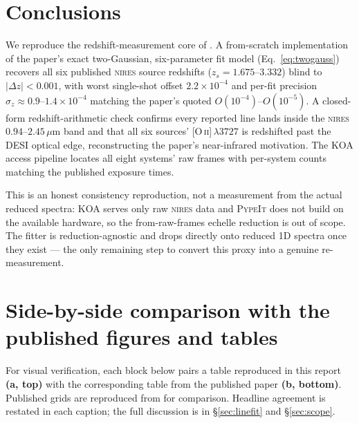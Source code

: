 \documentclass[11pt,letterpaper]{article}
\newcommand{\zs}{\ensuremath{z_s}}
\newcommand{\dz}{\ensuremath{\Delta z}}
\newcommand{\micron}{\ensuremath{\,\mu\mathrm{m}}}
\newcommand{\NIRES}{\textsc{nires}}
\begin{document}

\section{Conclusions}

We reproduce the redshift-measurement core of
\citet{agarwal2025foundry3}. A from-scratch implementation of the paper's
exact two-Gaussian, six-parameter fit model (Eq.~\ref{eq:twogauss})
recovers all six published \NIRES{} source redshifts ($\zs = 1.675$--$3.332$)
blind to $|\dz| < 0.001$, with worst single-shot offset $2.2\times10^{-4}$
and per-fit precision $\sigma_z \approx 0.9$--$1.4\times10^{-4}$ matching
the paper's quoted $O(10^{-4})$--$O(10^{-5})$. A closed-form
redshift-arithmetic check confirms every reported line lands inside the
\NIRES{} $0.94$--$2.45\micron$ band and that all six sources'
[O\,\textsc{ii}]\,$\lambda3727$ is redshifted past the DESI optical edge,
reconstructing the paper's near-infrared motivation. The KOA access
pipeline locates all eight systems' raw frames with per-system counts
matching the published exposure times.

This is an honest consistency reproduction, not a measurement from the
actual reduced spectra: KOA serves only raw \NIRES{} data and
\textsc{PypeIt} does not build on the available hardware, so the
from-raw-frames echelle reduction is out of scope. The fitter is
reduction-agnostic and drops directly onto reduced 1D spectra once they
exist --- the only remaining step to convert this proxy into a genuine
re-measurement.

\appendix
\section{Side-by-side comparison with the published figures and tables}
\label{app:compare}

For visual verification, each block below pairs a table reproduced in this
report \textbf{(a, top)} with the corresponding table from the published paper
\textbf{(b, bottom)}. Published grids are reproduced from
\citet{agarwal2025foundry3} for comparison. Headline agreement is restated in
each caption; the full discussion is in \S\ref{sec:linefit} and
\S\ref{sec:scope}.
\end{document}

